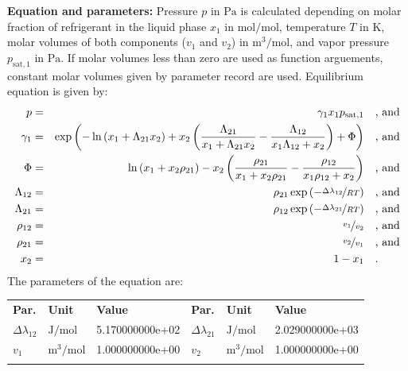 \textbf{Equation and parameters:}
\newline
%
Pressure $p$ in $\si{\pascal}$ is calculated depending on molar fraction of refrigerant in the liquid phase $x_1$ in $\si{\mole\per\mole}$, temperature $T$ in $\si{\kelvin}$, molar volumes of both components ($v_1$ and $v_2$) in $\si{\cubic\meter\per\mole}$, and vapor pressure $p_\mathrm{sat,1}$ in $\si{\pascal}$. If molar volumes less than zero are used as function arguements, constant molar volumes given by parameter record are used. Equilibrium equation is given by:
%
\begin{equation*}
\begin{split}
p &=& \gamma_1 x_1 p_\mathrm{sat,1} & \quad\text{, and} \\
\gamma_1 &=& \exp \left( - \ln \left( x_1 + \Lambda_{21} x_2 \right) + x_2 \left( \frac{\Lambda_{21}}{x_1 + \Lambda_{21} x_2} - \frac{\Lambda_{12}}{x_1 \Lambda_{12} + x_2} \right) + \Phi \right) & \quad\text{, and} \\
\Phi &=& \ln \left( x_1 + x_2 \rho_{21} \right) - x_2 \left( \frac{\rho_{21}}{x_1 + x_2 \rho_{21}} - \frac{\rho_{12}}{x_1 \rho_{12} + x_2} \right) & \quad\text{, and} \\
\Lambda_{12} &=& \rho_{21} \exp \left( - \nicefrac{\Delta\lambda_{12}}{R T} \right) & \quad\text{, and} \\
\Lambda_{21} &=& \rho_{12} \exp \left( - \nicefrac{\Delta\lambda_{21}}{R T} \right) & \quad\text{, and} \\
\rho_{12} &=& \nicefrac{v_1}{v_2} & \quad\text{, and} \\
\rho_{21} &=& \nicefrac{v_2}{v_1} & \quad\text{, and} \\
x_2 &=& 1 - x_1  & \quad\text{.} \\
\end{split}
\end{equation*}
%
The parameters of the equation are:
%
\begin{longtable}[l]{lll|lll}
\toprule
\addlinespace
\textbf{Par.} & \textbf{Unit} & \textbf{Value} &	\textbf{Par.} & \textbf{Unit} & \textbf{Value} \\
\addlinespace
\midrule
\endhead

\bottomrule
\endfoot
\bottomrule
\endlastfoot
\addlinespace

$\Delta\lambda_{12}$ & $\si{\joule\per\mole}$ & 5.170000000e+02 & $\Delta\lambda_{21}$ & $\si{\joule\per\mole}$ & 2.029000000e+03 \\
$v_1$ & $\si{\cubic\meter\per\mole}$ & 1.000000000e+00 & $v_2$ & $\si{\cubic\meter\per\mole}$ & 1.000000000e+00 \\

\addlinespace\end{longtable}

